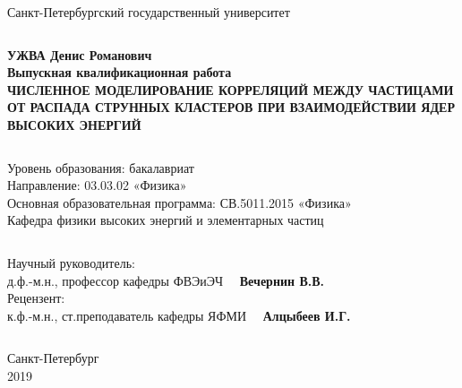 \documentclass[runningheads,a4paper]{article}
\begin{document}


\begin{center}
\Large{Санкт-Петербургский государственный университет} 
\end{center}
$$$$
$$$$
$$$$
$$$$
$$$$
$$$$


\begin{center}
\Large{{\bf УЖВА Денис Романович}}\\
\vspace{2em}
\Large{{\bf Выпускная квалификационная работа}}\\
\vspace{2em}
\Large{{\bf ЧИСЛЕННОЕ МОДЕЛИРОВАНИЕ КОРРЕЛЯЦИЙ МЕЖДУ ЧАСТИЦАМИ ОТ РАСПАДА СТРУННЫХ КЛАСТЕРОВ ПРИ ВЗАИМОДЕЙСТВИИ ЯДЕР ВЫСОКИХ ЭНЕРГИЙ }}
\end{center}
$$$$
$$$$
$$$$
$$$$


\begin{center}
\Large{ Уровень образования: бакалавриат }\\
\Large{ Направление: 03.03.02 «Физика» }\\
\Large{ Основная образовательная программа: СВ.5011.2015 «Физика» }\\
\vspace{1em}
\Large{ Кафедра физики высоких энергий и элементарных частиц }
\end{center}


$$$$
$$$$
$$$$
$$$$
$$$$
$$$$

\begin{flushright}
$$$$
Научный руководитель: \\
д.ф.-м.н., профессор кафедры ФВЭиЭЧ \ \ {\bf Вечернин В.В.} \\
\vspace{2em}
Рецензент: \\
к.ф.-м.н., ст.преподаватель кафедры ЯФМИ \ \ {\bf Алцыбеев И.Г.} \\
\end{flushright}
$$$$

\begin{center}
\Large{
Санкт-Петербург \\
2019}
\end{center}
\end{document}
